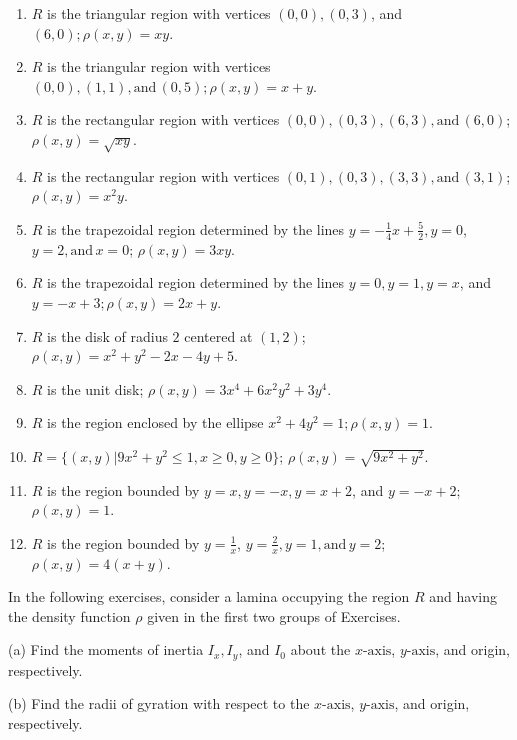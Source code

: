 \documentclass{exercises}
\begin{document}
\begin{enumerate}[resume]
\item \techrequired $R$ is the triangular region with vertices $(0,0),(0,3)$, and $(6,0);\rho(x,y)=xy$.
\item \techrequired $R$ is the triangular region with vertices $(0,0),(1,1),\text{and}\,(0,5);\rho(x,y)=x+y$.
\item \techrequired $R$ is the rectangular region with vertices $(0,0),(0,3),(6,3),\text{and}\,(6,0)$; $\rho(x,y)=\sqrt{xy}$.
\item \techrequired $R$ is the rectangular region with vertices $(0,1),(0,3),(3,3),\text{and}\,(3,1)$; $\rho(x,y)=x^{2}y$.
\item \techrequired $R$ is the trapezoidal region determined by the lines $y=-\frac{1}{4}x+\frac{5}{2},y=0$, $y=2,\text{and}\,x=0$; $\rho(x,y)=3xy$.
\item \techrequired $R$ is the trapezoidal region determined by the lines $y=0,y=1,y=x$, and $y=-x+3;\rho(x,y)=2x+y$.
\item \techrequired $R$ is the disk of radius $2$ centered at $(1,2)$; $\rho(x,y)=x^{2}+y^{2}-2x-4y+5$.
\item \techrequired $R$ is the unit disk; $\rho(x,y)=3x^{4}+6x^{2}y^{2}+3y^{4}$.
\item \techrequired $R$ is the region enclosed by the ellipse $x^{2}+4y^{2}=1;\rho(x,y)=1$.
\item \techrequired $R=\{(x,y)|9x^{2}+y^{2}\le1,x\ge0,y\ge0\}$; $\rho(x,y)=\sqrt{9x^{2}+y^{2}}$.
\item \techrequired $R$ is the region bounded by $y=x,y=-x,y=x+2$, and $y=-x+2$; $\rho(x,y)=1$.
\item \techrequired $R$ is the region bounded by $y=\frac{1}{x}$, $y=\frac{2}{x},y=1,\text{and}\,y=2$; $\rho(x,y)=4(x+y)$.
\end{enumerate}

In the following exercises, consider a lamina occupying the region $R$ and having the density function $\rho$ given in the first two groups of Exercises.


(a) Find the moments of inertia $I_{x},I_{y}$, and $I_{0}$ about the $x\text{-axis}$, $y\text{-axis}$, and origin, respectively.


(b) Find the radii of gyration with respect to the $x\text{-axis}$, $y\text{-axis}$, and origin, respectively.
\end{document}
